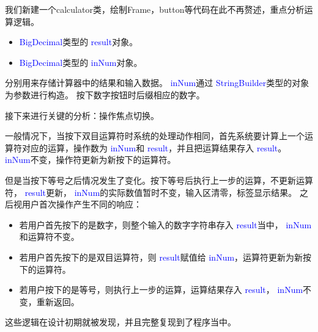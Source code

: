 \documentclass{ctexart}
\begin{document}
我们新建一个calculator类，绘制Frame，button等代码在此不再赘述，重点分析运算逻辑。
\begin{itemize}
    \item \textcolor{blue}{ BigDecimal}类型的\textcolor{blue}{ result}对象。
    \item \textcolor{blue}{ BigDecimal}类型的\textcolor{blue}{ inNum}对象。
\end{itemize}
分别用来存储计算器中的结果和输入数据。\textcolor{blue}{ inNum}通过\textcolor{blue}{ StringBuilder}类型的对象为参数进行构造。
按下数字按钮时后缀相应的数字。

接下来进行关键的分析：操作焦点切换。

一般情况下，当按下双目运算符时系统的处理动作相同，首先系统要计算上一个运算符对应的运算，操作数为\textcolor{blue}{ inNum}和\textcolor{blue}{ result}，并且把运算结果存入\textcolor{blue}{ result}。\textcolor{blue}{ inNum}不变，操作符更新为新按下的运算符。

但是当按下等号之后情况发生了变化。按下等号后执行上一步的运算，不更新运算符，\textcolor{blue}{ result}更新，\textcolor{blue}{ inNum}的实际数值暂时不变，输入区清零，标签显示结果。
之后视用户首次操作产生不同的响应：
\begin{itemize}
    \item 若用户首先按下的是数字，则整个输入的数字字符串存入\textcolor{blue}{ result}当中，\textcolor{blue}{ inNum}和运算符不变。
    \item 若用户首先按下的是双目运算符，则\textcolor{blue}{ result}赋值给\textcolor{blue}{ inNum}，运算符更新为新按下的运算符。
    \item 若用户按下的是等号，则执行上一步的运算，运算结果存入\textcolor{blue}{ result}，\textcolor{blue}{ inNum}不变，重新返回。
\end{itemize}
这些逻辑在设计初期就被发现，并且完整复现到了程序当中。
\end{document}
